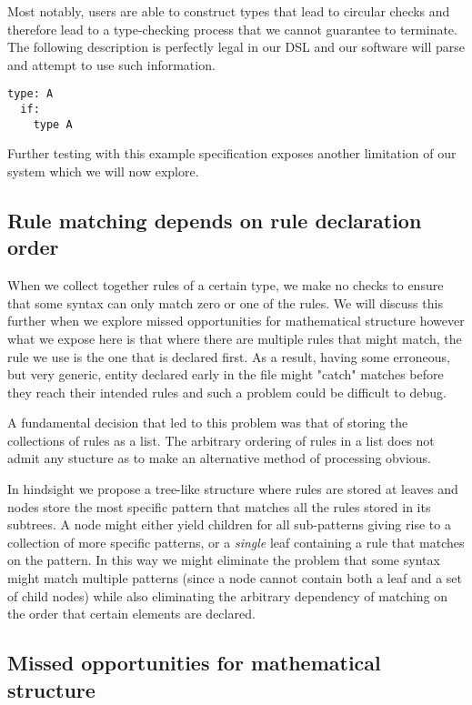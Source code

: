 Most notably, users are able to construct types that lead to circular
checks and therefore lead to a type-checking process that we cannot
guarantee to terminate. The following description is perfectly legal
in our DSL and our software will parse and attempt to use such
information.

\begin{verbatim}
type: A
  if:
    type A
\end{verbatim}

Further testing with this example specification exposes another
limitation of our system which we will now explore.

\subsection{Rule matching depends on rule declaration order}

When we collect together rules of a certain type, we make no checks to
ensure that some syntax can only match zero or one of the rules. We
will discuss this further when we explore missed opportunities for
mathematical structure however what we expose here is that where there
are multiple rules that might match, the rule we use is the one that
is declared first. As a result, having some erroneous, but very
generic, entity declared early in the file might "catch" matches
before they reach their intended rules and such a problem could be
difficult to debug.

A fundamental decision that led to this problem was that of storing
the collections of rules as a list. The arbitrary ordering of rules in
a list does not admit any stucture as to make an alternative method of
processing obvious.

In hindsight we propose a tree-like structure where rules are stored
at leaves and nodes store the most specific pattern that matches all
the rules stored in its subtrees. A node might either yield children
for all sub-patterns giving rise to a collection of more specific
patterns, or a \emph{single} leaf containing a rule that matches on the
pattern. In this way we might eliminate the problem that some syntax
might match multiple patterns (since a node cannot contain both a leaf
and a set of child nodes) while also eliminating the arbitrary
dependency of matching on the order that certain elements are declared.

\subsection{Missed opportunities for mathematical structure}

